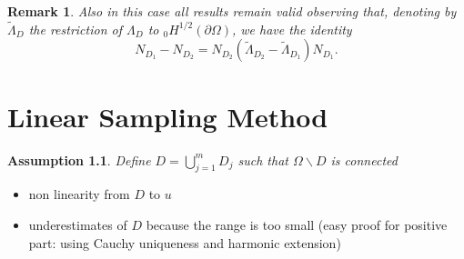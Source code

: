 \documentclass[10pt, a4paper, twoside, openright]{book}
\theoremstyle{definition}
\theoremstyle{plain}
\theoremstyle{plain}
\theoremstyle{plain}
\theoremstyle{plain}
\newtheorem{remark}[subsection]{Remark}
\theoremstyle{plain}
\theoremstyle{plain}
\theoremstyle{plain}
\newtheorem{assumption}[subsection]{Assumption}
\theoremstyle{plain}
\begin{document}
\begin{remark}
Also in this case all results remain valid observing  that, denoting by $\tilde\Lambda_D$ the restriction of 
$\Lambda_D$ to $_0H^{1/2}(\partial\Omega)$, we have the identity
$$N_{D_1}-N_{D_2}=N_{D_2}(\tilde\Lambda_{D_2}-\tilde\Lambda_{D_1})N_{D_1}.$$
\end{remark}

\chapter{Linear Sampling Method}
\label{ch:linear-sampling}
\begin{assumption}
\label{assumption:connected}
 Define $D=\bigcup_{j=1}^mD_j$ such that $\Omega\backslash D$ is connected
\end{assumption}
\begin{itemize}
 \item non linearity from $D$ to $u$
 \item underestimates of $D$ because the range is too small (easy proof for positive part: using Cauchy uniqueness and harmonic extension)
\end{itemize}
\end{document}
